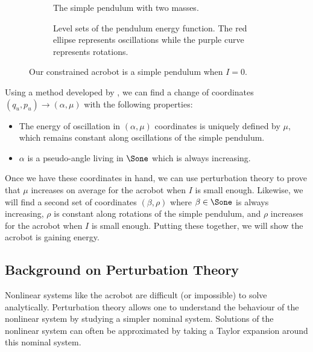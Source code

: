 \begin{figure}
    \centering
    \begin{subfigure}[t]{0.45\textwidth}
        \caption{The simple pendulum with two masses.}
        \label{fig:acrobot-I0}
    \end{subfigure}
    \hfill
    \begin{subfigure}[t]{0.45\textwidth}
        \caption{Level sets of the pendulum energy function.
            The red ellipse represents oscillations while the purple curve
            represents rotations.}
        \label{fig:pendulum-level-sets}
    \end{subfigure}
    \caption{Our constrained acrobot is a simple pendulum when \(I = 0\).}
\end{figure}

Using a method developed by \citet{dynamic_vhcs_stabilize_closed_orbits},
we can find a change of coordinates \((q_u,p_u) \to (\alpha, \mu)\) with the
following properties:
\begin{itemize}
    \item The energy of oscillation in \((\alpha,\mu)\) coordinates is 
        uniquely defined by \(\mu\), which remains constant along oscillations
        of the simple pendulum.
    \item \(\alpha\) is a pseudo-angle living in \(\Sone\) which is
        always increasing.
\end{itemize}
Once we have these coordinates in hand, we can use perturbation theory to prove
that \(\mu\) increases on average for the acrobot when \(I\) is small enough.
Likewise, we will find a second set of coordinates \((\beta, \rho)\) where
\(\beta \in \Sone\) is always increasing, \(\rho\) is constant along
rotations of the simple pendulum, and \(\rho\) increases for the acrobot when
\(I\) is small enough.
Putting these together, we will show the acrobot is gaining energy.

\subsection*{Background on Perturbation Theory}
Nonlinear systems like the acrobot are difficult (or impossible) to solve
analytically.
Perturbation theory allows one to understand the behaviour of the nonlinear system
by studying a simpler nominal system. 
Solutions of the nonlinear system can often be approximated by taking a Taylor
expansion around this nominal system.

